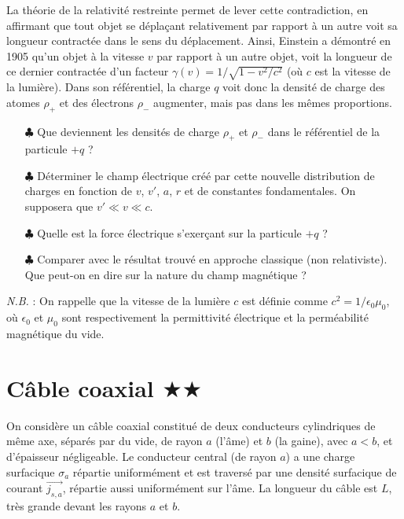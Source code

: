 \documentclass{report}
\begin{document}
La théorie de la relativité restreinte permet de lever cette contradiction, en affirmant que tout objet se déplaçant relativement par rapport à un autre voit sa longueur contractée dans le sens du déplacement. Ainsi, Einstein a démontré en 1905 qu'un objet à la vitesse $v$ par rapport à un autre objet, voit la longueur de ce dernier contractée d'un facteur $\gamma(v)=1/\sqrt{1-v^{2}/c^{2}}$ (où $c$ est la vitesse de la lumière). Dans son référentiel, la charge $q$ voit donc la densité de charge des atomes $\rho_+$ et des électrons $\rho_-$ augmenter, mais pas dans les mêmes proportions. 
	\begin{itemize}
		\item[$\clubsuit$] Que deviennent les densités de charge $\rho_{+}$ et $\rho_{-}$ dans le référentiel de la particule $+q$ ? %
		\item[$\clubsuit$] Déterminer le champ électrique créé par cette nouvelle distribution de charges en fonction de $v$, $v'$, $a$, $r$ et de constantes fondamentales. On supposera que $v'\ll v\ll c$.
		\item[$\clubsuit$] Quelle est la force électrique s'exerçant sur la particule $+q$ ? 
		\item[$\clubsuit$] Comparer avec le résultat trouvé en approche classique (non relativiste). Que peut-on en dire sur la nature du champ magnétique ?
	\end{itemize}
			
\textit{N.B.} : On rappelle que la vitesse de la lumière $c$ est définie comme $c^{2}=1/\epsilon_{0}\mu_{0}$, où $\epsilon_{0}$ et $\mu_{0}$ sont respectivement la permittivité électrique et la perméabilité magnétique du vide.

\newpage

\section*{Câble coaxial $\bigstar\bigstar$}

On considère un câble coaxial constitué de deux conducteurs cylindriques de même axe, séparés par du vide, de rayon $a$ (l'âme) et $b$ (la gaine), avec $a<b$, et d'épaisseur négligeable. Le conducteur central (de rayon $a$) a une charge surfacique $\sigma_a$ répartie uniformément et est traversé par une densité surfacique de courant $\vec{j_{s,a}}$, répartie aussi uniformément sur l'âme. La longueur du câble est $L$, très grande devant les rayons $a$ et $b$.  
\end{document}

